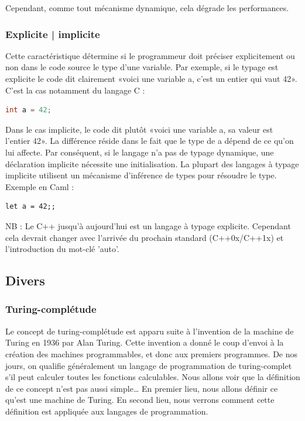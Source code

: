 Cependant, comme tout mécanisme dynamique, cela dégrade les performances.

\subsubsection{Explicite | implicite}
\label{explicite_implicite}

Cette caractéristique détermine si le programmeur doit préciser explicitement ou non dans le code source le type d'une variable. Par exemple, si le typage est explicite le code dit clairement «voici une variable a, c'est un entier qui vaut 42». C'est la cas notamment du langage C :

\begin{lstlisting}[language=c]
int a = 42;
\end{lstlisting}

Dans le cas implicite, le code dit plutôt «voici une variable a, sa valeur est l'entier 42». La différence réside dans le fait que le type de a dépend de ce qu'on lui affecte. Par conséquent, si le langage n'a pas de typage dynamique, une déclaration implicite nécessite une initialisation. La plupart des langages à typage implicite utilisent un mécanisme d'inférence de types pour résoudre le type. \cite{bib_wiki_inference} Exemple en Caml :

\begin{lstlisting}[language=caml]
let a = 42;;
\end{lstlisting}

NB : Le C++ jusqu'à aujourd'hui est un langage à typage explicite. Cependant cela devrait changer avec l'arrivée du prochain standard (C++0x/C++1x) et l'introduction du mot-clé 'auto'. \cite{bib_wiki_inference_cpp}

\subsection{Divers}
\label{divers}

\subsubsection{Turing-complétude}
\label{turing}

Le concept de turing-complétude est apparu suite à l'invention de la machine de Turing en 1936 par Alan Turing. Cette invention a donné le coup d'envoi à la création des machines programmables, et donc aux premiers programmes. De nos jours, on qualifie généralement un langage de programmation de turing-complet s'il peut calculer toutes les fonctions calculables. Nous allons voir que la définition de ce concept n'est pas aussi simple… En premier lieu, nous allons définir ce qu'est une machine de Turing. En second lieu, nous verrons comment cette définition est appliquée aux langages de programmation.

